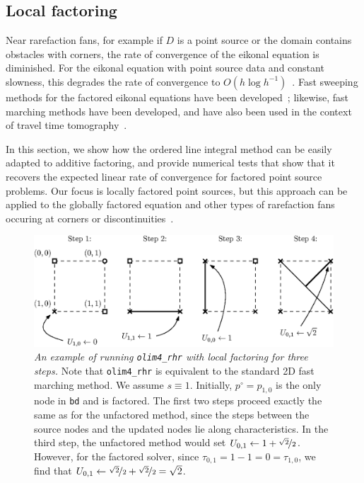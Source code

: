 \documentclass[smallcondensed]{svjour3}
\begin{document}
\subsection{Local factoring}

Near rarefaction fans, for example if $D$ is a point source or the
domain contains obstacles with corners, the rate of convergence of the
eikonal equation is diminished. For the eikonal equation with point
source data and constant slowness, this degrades the rate of
convergence to $O(h \log
h^{-1})$~\cite{qi2018corner,zhao2005fast}. Fast sweeping methods for
the factored eikonal equations have been
developed~\cite{fomel2009fast,luo2012fast}; likewise, fast marching
methods have been developed, and have also been used in the context of
travel time tomography~\cite{qi2018corner,treister2016fast}.

In this section, we show how the ordered line integral method can be
easily adapted to additive factoring, and provide numerical tests that
show that it recovers the expected linear rate of convergence for
factored point source problems. Our focus is locally factored point
sources, but this approach can be applied to the globally factored
equation and other types of rarefaction fans occuring at corners or
discontinuities~\cite{qi2018corner}.

\begin{figure}
  \centering
  \includegraphics[width=\linewidth]{factoring-example.eps}
  \caption{\emph{An example of running \texttt{olim4\_rhr} with local
      factoring for three steps.} Note that \texttt{olim4\_rhr} is
    equivalent to the standard 2D fast marching method. We assume
    $s \equiv 1$. Initially, $p^\circ = p_{1, 0}$ is the only node in
    \texttt{bd} and is factored. The first two steps proceed exactly
    the same as for the unfactored method, since the steps between the
    source nodes and the updated nodes lie along characteristics. In
    the third step, the unfactored method would set
    $U_{0,1} \gets 1 + \nicefrac{\sqrt{2}}{2}$. However, for the
    factored solver, since $\tau_{0,1} = 1 - 1 = 0 = \tau_{1,0}$, we
    find that
    $U_{0,1} \gets \nicefrac{\sqrt{2}}{2} + \nicefrac{\sqrt{2}}{2} =
    \sqrt{2}$.}\label{fig:factoring-example}
\end{figure}
\end{document}
